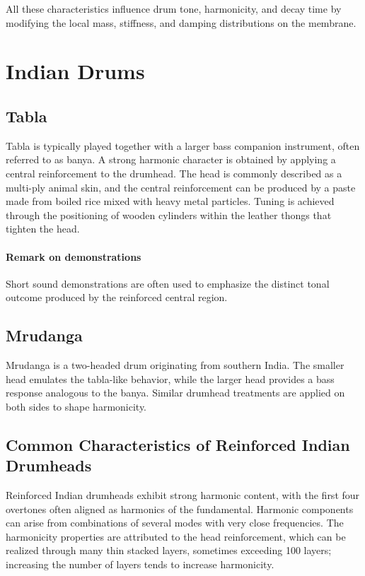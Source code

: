 All these characteristics influence drum tone, harmonicity, and decay time by modifying the local mass, stiffness, and damping distributions on the membrane.

\section{Indian Drums}

\subsection{Tabla}

Tabla is typically played together with a larger bass companion instrument, often referred to as banya. A strong harmonic character is obtained by applying a central reinforcement to the drumhead. The head is commonly described as a multi-ply animal skin, and the central reinforcement can be produced by a paste made from boiled rice mixed with heavy metal particles. Tuning is achieved through the positioning of wooden cylinders within the leather thongs that tighten the head.

\paragraph{Remark on demonstrations} Short sound demonstrations are often used to emphasize the distinct tonal outcome produced by the reinforced central region.

\subsection{Mrudanga}

Mrudanga is a two-headed drum originating from southern India. The smaller head emulates the tabla-like behavior, while the larger head provides a bass response analogous to the banya. Similar drumhead treatments are applied on both sides to shape harmonicity. 

\subsection{Common Characteristics of Reinforced Indian Drumheads}

Reinforced Indian drumheads exhibit strong harmonic content, with the first four overtones often aligned as harmonics of the fundamental. Harmonic components can arise from combinations of several modes with very close frequencies. The harmonicity properties are attributed to the head reinforcement, which can be realized through many thin stacked layers, sometimes exceeding 100 layers; increasing the number of layers tends to increase harmonicity.
